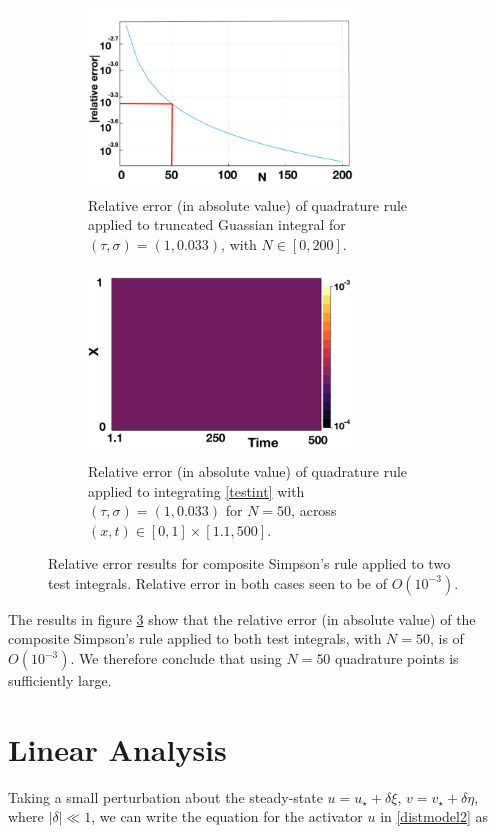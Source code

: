 \begin{figure}[H]
    \centering
    \begin{subfigure}[b]{0.45\textwidth}
        \centering
        \includegraphics[width=7cm,height=5cm]{truncerr.png}
        \caption{Relative error (in absolute value) of quadrature rule applied to truncated Guassian integral for $(\tau,\sigma)=(1,0.033)$, with $N\in[0, 200]$.}
        \label{fig:truncerr}
    \end{subfigure}
    \hfill
    \begin{subfigure}[b]{0.45\textwidth}
        \centering
        \includegraphics[width=7cm,height=5cm]{disterr.png}
        \caption{Relative error (in absolute value) of quadrature rule applied to integrating \eqref{testint} with $(\tau,\sigma)=(1,0.033)$ for $N=50$, across $(x,t)\in[0,1]\times[1.1,500]$.}
        \label{fig:distint}
    \end{subfigure}
    \caption{Relative error results for composite Simpson's rule applied to two test integrals. Relative error in both cases seen to be of $O(10^{-3})$.}
    \label{fig:testquad}
\end{figure}
The results in figure \ref{fig:testquad} show that the relative error (in absolute value) of the composite Simpson's rule applied to both test integrals, with $N=50$, is of $O(10^{-3})$. We therefore conclude that using $N=50$ quadrature points is sufficiently large.


\section{Linear Analysis}\label{section:distlin}
Taking a small perturbation about the steady-state $u=u_\star+\delta\xi$, $v=v_\star+\delta\eta$, where $|\delta|\ll1$, we can write the equation for the activator $u$ in \eqref{distmodel2} as

